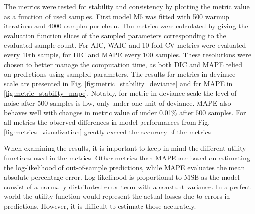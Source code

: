 \documentclass[english, 12pt, a4paper, sci, utf8, a-1b, online]{aaltothesis}
\begin{document}
\begin{abstractpage}[english]


The metrics were tested for stability and consistency by plotting the metric value as a function of used samples. First model M5 was fitted with 500 warmup iterations and 4000 samples per chain. The metrics were calculated by giving the evaluation function slices of the sampled parameters corresponding to the evaluated sample count. For AIC, WAIC and 10-fold CV metrics were evaluated every 10th sample, for DIC and MAPE every 100 samples. These resolutions were chosen to better manage the computation time, as both DIC and MAPE relied on predictions using sampled parameters. The results for metrics in devinace scale are presented in Fig. \ref{fig:metric_stability_deviance} and for MAPE in \ref{fig:metric_stability_mape}. Notably, for metric in deviance scale the level of noise after 500 samples is low, only under one unit of deviance. MAPE also behaves well with changes in metric value of under 0.01\% after 500 samples. For all metrics the observed differences in model performances from Fig. \ref{fig:metrics_visualization} greatly exceed the accuracy of the metrics.


When examining the results, it is important to keep in mind the different utility functions used in the metrics. Other metrics than MAPE are based on estimating the log-likelihood of out-of-sample predictions, while MAPE evaluates the mean absolute percentage error. Log-likelihood is proportional to MSE as the model consist of a normally distributed error term with a constant variance. In a perfect world the utility function would represent the actual losses due to errors in predictions. However, it is difficult to estimate those accurately. 


\end{abstractpage}
\end{document}
